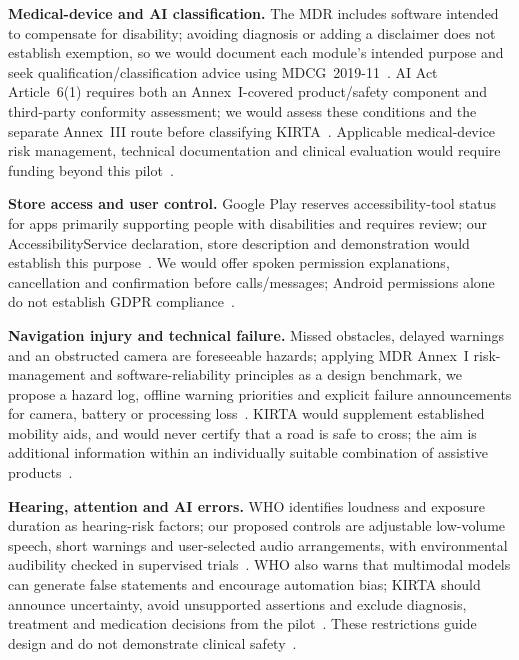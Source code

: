 \documentclass[10pt,twoside,english,a4paper]{article}
\begin{document}
\textbf{Medical-device and AI classification.} The MDR includes software intended to compensate for disability; avoiding diagnosis or adding a disclaimer does not establish exemption, so we would document each module's intended purpose and seek qualification/classification advice using MDCG~2019-11~\cite{mdr2017,mdcg2019software}. AI Act Article~6(1) requires both an Annex~I-covered product/safety component and third-party conformity assessment; we would assess these conditions and the separate Annex~III route before classifying KIRTA~\cite{aiactarticle62026}. Applicable medical-device risk management, technical documentation and clinical evaluation would require funding beyond this pilot~\cite{mdr2017,mdcgclinical2020}.

\textbf{Store access and user control.} Google Play reserves accessibility-tool status for apps primarily supporting people with disabilities and requires review; our AccessibilityService declaration, store description and demonstration would establish this purpose~\cite{playaccessibility2026}. We would offer spoken permission explanations, cancellation and confirmation before calls/messages; Android permissions alone do not establish GDPR compliance~\cite{gdpr,androidintents}.

\textbf{Navigation injury and technical failure.} Missed obstacles, delayed warnings and an obstructed camera are foreseeable hazards; applying MDR Annex~I risk-management and software-reliability principles as a design benchmark, we propose a hazard log, offline warning priorities and explicit failure announcements for camera, battery or processing loss~\cite{mdr2017}. KIRTA would supplement established mobility aids, and would never certify that a road is safe to cross; the aim is additional information within an individually suitable combination of assistive products~\cite{whotechnology2024,mdr2017}.

\textbf{Hearing, attention and AI errors.} WHO identifies loudness and exposure duration as hearing-risk factors; our proposed controls are adjustable low-volume speech, short warnings and user-selected audio arrangements, with environmental audibility checked in supervised trials~\cite{wholistening2026}. WHO also warns that multimodal models can generate false statements and encourage automation bias; KIRTA should announce uncertainty, avoid unsupported assertions and exclude diagnosis, treatment and medication decisions from the pilot~\cite{who2024ai}. These restrictions guide design and do not demonstrate clinical safety~\cite{mdcgclinical2020}.
\end{document}
